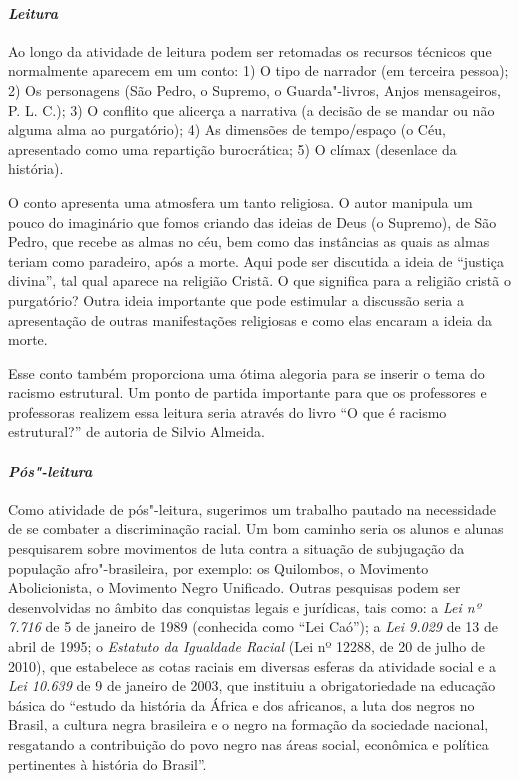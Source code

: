 \documentclass[11pt]{extarticle}
\begin{document}
{{\paragraph{\textit{Leitura}}

Ao longo da atividade de leitura podem ser retomadas os recursos
técnicos que normalmente aparecem em um conto: 1) O tipo de narrador (em
terceira pessoa); 2) Os personagens (São Pedro, o Supremo, o Guarda"-livros,
Anjos mensageiros, P. L. C.); 3) O conflito que alicerça a narrativa (a
decisão de se mandar ou não alguma alma ao purgatório); 4) As dimensões
de tempo/espaço (o Céu, apresentado como uma repartição burocrática; 5)
O clímax (desenlace da história).

O conto apresenta uma atmosfera um tanto religiosa. O autor manipula um
pouco do imaginário que fomos criando das ideias de Deus (o Supremo), de
São Pedro, que recebe as almas no céu, bem como das instâncias as quais
as almas teriam como paradeiro, após a morte. Aqui pode ser discutida a
ideia de ``justiça divina'', tal qual aparece na religião Cristã. O que
significa para a religião cristã o purgatório? Outra ideia importante
que pode estimular a discussão seria a apresentação de outras
manifestações religiosas e como elas encaram a ideia da morte.






Esse conto também proporciona uma ótima alegoria para se inserir o tema
do racismo estrutural. Um ponto de partida importante para que os
professores e professoras realizem essa leitura seria através do livro
``O que é racismo estrutural?'' de autoria de Silvio Almeida.

\paragraph{\textit{Pós"-leitura}}

Como atividade de pós"-leitura, sugerimos um trabalho pautado na
necessidade de se combater a discriminação racial. Um bom caminho seria
os alunos e alunas pesquisarem sobre movimentos de luta contra a
situação de subjugação da população afro"-brasileira, por exemplo: os
Quilombos, o Movimento Abolicionista, o Movimento Negro Unificado.
Outras pesquisas podem ser desenvolvidas no âmbito das conquistas legais
e jurídicas, tais como: a \textit{Lei nº 7.716} de 5 de janeiro de 1989
(conhecida como ``Lei Caó''); a \textit{Lei 9.029} de 13 de abril de
1995; o \textit{Estatuto da Igualdade Racial} (Lei nº 12288, de 20 de
julho de 2010), que estabelece as cotas raciais em diversas esferas da
atividade social e a \textit{Lei 10.639} de 9 de janeiro de 2003, que
instituiu a obrigatoriedade na educação básica do ``estudo da história
da África e dos africanos, a luta dos negros no Brasil, a cultura negra
brasileira e o negro na formação da sociedade nacional, resgatando a
contribuição do povo negro nas áreas social, econômica e política
pertinentes à história do Brasil''.

}}
\end{document}
